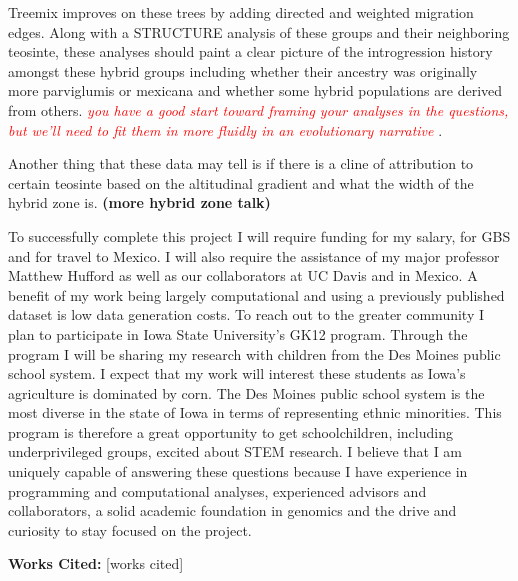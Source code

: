 \documentclass[12pt]{amsart}
\newcommand{\mbh}[1]{\textcolor{red}{ \emph{\scriptsize  #1}} }
\begin{document}
Treemix improves on these trees by adding directed and weighted migration edges.%
Along with a STRUCTURE analysis of these groups and their neighboring teosinte, these analyses should paint a clear picture of the introgression history amongst these hybrid groups including whether their ancestry was originally more parviglumis or mexicana and whether some hybrid populations are derived from others.
\mbh{you have a good start toward framing your analyses in the questions, but we'll need to fit them in more fluidly in an evolutionary narrative}.

Another thing that these data may tell is if there is a cline of attribution to certain teosinte based on the altitudinal gradient and what the width of the hybrid zone is. \textbf{(more hybrid zone talk)}

To successfully complete this project I will require funding for my salary, for GBS and for travel to Mexico.  I will also require the assistance of my major professor Matthew Hufford as well as our collaborators at UC Davis and in Mexico.
A benefit of my work being largely computational and using a previously published dataset is low data generation costs.
To reach out to the greater community I plan to participate in Iowa State University's GK12 program.  Through the program I will be sharing my research with children from the Des Moines public school system.  
I expect that my work will interest these students as Iowa's agriculture is dominated by corn.
The Des Moines public school system is the most diverse in the state of Iowa in terms of representing ethnic minorities.  This program is therefore a great opportunity to get schoolchildren, including underprivileged groups, excited about STEM research.  
I believe that I am uniquely capable of answering these questions because I have experience in programming and computational analyses, experienced advisors and collaborators, a solid academic foundation in genomics and the drive and curiosity to stay focused on the project.

\textbf{Works Cited:}
\small
[works cited]
\end{document}
